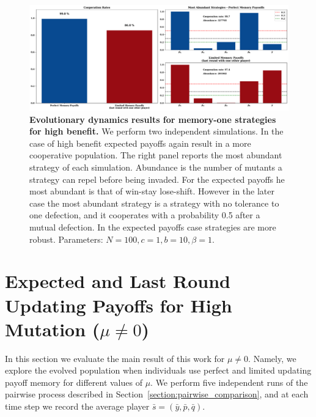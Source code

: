 \documentclass[11pt]{article}
\theoremstyle{plainCl1}
\theoremstyle{plainCl2}
\begin{document}
\begin{figure}[!htbp]
  \centering 
  \includegraphics[width=\textwidth]{static/memory_one_results_high_benefit.pdf}
  \caption{\textbf{Evolutionary dynamics results for memory-one strategies for high benefit.}
  We perform two independent simulations. In the case of high benefit expected
  payoffs again result in a more cooperative population. The right panel reports
  the most abundant strategy of each simulation. Abundance is the number of
  mutants a strategy can repel before being invaded. For the expected payoffs he
  most abundant is that of win-stay lose-shift. However in the later case the
  most abundant strategy is a strategy with no tolerance to one defection, and
  it cooperates with a probability 0.5 after a mutual defection.  In the expected
  payoffs case strategies are more robust.  Parameters: \(N =100, c=1, b=10,
  \beta=1\).}\label{fig:memory_one_high_benefit}
\end{figure}


\section{Expected and Last Round Updating Payoffs for High Mutation ($\mu \neq 0$)}\label{section:mutation}

In this section we evaluate the main result of this work for \(\mu \neq 0\).
Namely, we explore the evolved population when individuals use perfect and
limited updating payoff memory for different values of \(\mu\). We perform five
independent runs of the pairwise process described in
Section~\ref{section:pairwise_comparison}, and at each time step we record the
average player \(\bar{s}=(\bar{y}, \bar{p}, \bar{q})\).
\end{document}
